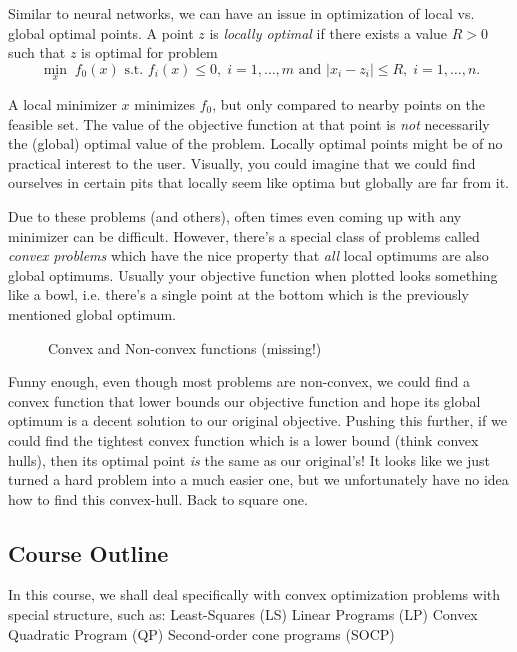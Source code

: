 \documentclass[11 pt]{scrartcl}
\begin{document}
Similar to neural networks, we can have an issue in optimization of local vs. global optimal points. 
A point $z$ is \emph{locally optimal} if there exists a value $R>0$ such that $z$ is optimal for problem 
\[ \min_x\; f_0(x) \text{ s.t. } f_i(x) \leq 0,\;  i=1, \dots, m \text{ and } |x_i - z_i| \leq R,\; i=1, \dots, n.\] 

A local minimizer $x$ minimizes $f_0$, but only compared to nearby points on the feasible set. 
The value of the objective function at that point is \emph{not} necessarily the (global) optimal value of the problem. 
Locally optimal points might be of no practical interest to the user. 
Visually, you could imagine that we could find ourselves in certain pits that locally seem like optima but globally are far from it. 

Due to these problems (and others), often times even coming up with any minimizer can be difficult. 
However, there's a special class of problems called \emph{convex problems} which have the nice property that \emph{all} local optimums are also global optimums.
Usually your objective function when plotted looks something like a bowl, i.e. there's a single point at the bottom which is the previously mentioned global optimum.

\begin{figure}[!htb]
    \caption{Convex and Non-convex functions (missing!)}
\end{figure}

Funny enough, even though most problems are non-convex, we could find a convex function that lower bounds our objective function and hope its global optimum is a decent solution to our original objective. 
Pushing this further, if we could find the tightest convex function which is a lower bound (think convex hulls), then its optimal point \emph{is} the same as our original's! 
It looks like we just turned a hard problem into a much easier one, but we unfortunately have no idea how to find this convex-hull. 
Back to square one. 

\subsection{Course Outline}

In this course, we shall deal specifically with convex optimization problems with special structure, such as: 
\itemnum
    \ii Least-Squares (LS)
    \ii Linear Programs (LP)
    \ii Convex Quadratic Program (QP)
    \ii Second-order cone programs (SOCP)
\itemend
\end{document}
